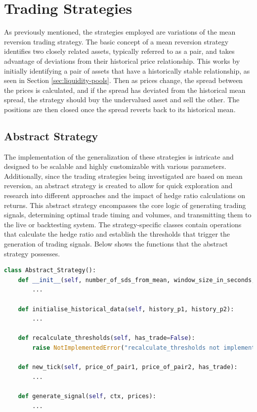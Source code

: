 \chapter{Trading Strategies}
\label{sec:strats}
As previously mentioned, the strategies employed are variations of the mean reversion trading strategy. The basic concept of a mean reversion strategy identifies two closely related assets, typically referred to as a pair, and takes advantage of deviations from their historical price relationship. This works by initially identifying a pair of assets that have a historically stable relationship, as seen in Section \ref{sec:liquidity-pools}. Then as prices change, the spread between the prices is calculated, and if the spread has deviated from the historical mean spread, the strategy should buy the undervalued asset and sell the other. The positions are then closed once the spread reverts back to its historical mean.

\section{Abstract Strategy}
The implementation of the generalization of these strategies is intricate and designed to be scalable and highly customizable with various parameters. Additionally, since the trading strategies being investigated are based on mean reversion, an abstract strategy is created to allow for quick exploration and research into different approaches and the impact of hedge ratio calculations on returns. This abstract strategy encompasses the core logic of generating trading signals, determining optimal trade timing and volumes, and transmitting them to the live or backtesting system. The strategy-specific classes contain operations that calculate the hedge ratio and establish the thresholds that trigger the generation of trading signals. Below shows the functions that the abstract strategy possesses.
\begin{lstlisting}[language=Python]
class Abstract_Strategy():
    def __init__(self, number_of_sds_from_mean, window_size_in_seconds, percent_to_invest, strategy_name, gas_price_threshold, rebalance_threshold_as_percent_of_initial_investment):
        ...

    def initialise_historical_data(self, history_p1, history_p2):
        ...

    def recalculate_thresholds(self, has_trade=False):
        raise NotImplementedError("recalculate_thresholds not implemented")

    def new_tick(self, price_of_pair1, price_of_pair2, has_trade):
        ...

    def generate_signal(self, ctx, prices):
        ...

\end{lstlisting}

